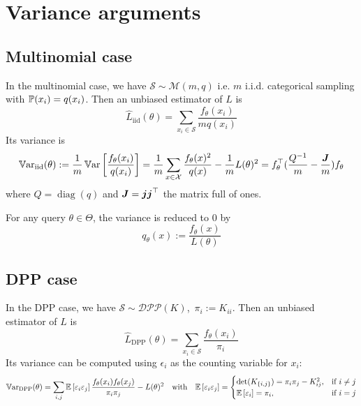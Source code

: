 \section{Variance arguments}
\subsection{Multinomial case}


In the multinomial case, we have $\mathcal S \sim \mathcal M(m, q)$ i.e. $m$ i.i.d. categorical sampling with $\mathbb{P}(x_i) = q(x_i)$.
Then an unbiased estimator of $L$ is
\begin{equation*}
	\hat L_{\textrm{iid}}(\theta) = \sum_{x_i\in \mathcal S} \frac{f_\theta(x_i)}{m q(x_i)}
\end{equation*}
Its variance is
\begin{equation}
	\operatorname{\mathbb V ar}_{\textrm{iid}}(\theta) :=\frac{1}{m} \operatorname{\mathbb V ar}\left[\frac {f_{\theta}(x_i)} {q(x_i)}\right] 
	=\frac{1}{m} \sum_{x \in \mathcal{X}} \frac{f_{\theta}(x)^{2}}{q(x)} -\frac{1}{m} L(\theta)^{2} = f_\theta^\top(\frac{Q^{-1}} m - \frac{\boldsymbol{J}} m)f_\theta
\end{equation}
where $Q = \operatorname{diag}(q)$ and $\boldsymbol{J} = \boldsymbol{j} \boldsymbol{j} ^\top$ the matrix full of ones. 

For any query $\theta \in \Theta$, the variance is reduced to 0 by
$$
q_{\theta}(x):=\frac{ f_{\theta}(x)}{L(\theta)}
$$


\subsection{DPP case}
In the DPP case, we have $ \mathcal S \sim \mathcal{DPP}(K)$, \,$\pi_i := K_{ii}$. Then an unbiased estimator of $L$ is
\begin{equation*}
	\hat L_{\textrm{DPP}}(\theta) = \sum_{x_i\in \mathcal S} \frac{f_\theta(x_i)}{\pi_i}
\end{equation*}
Its variance can be computed using $\epsilon_i$ as the counting variable for $x_i$:
$$
\operatorname{\mathbb V ar}_{\textrm{DPP}}(\theta)
=\sum_{i, j}\mathbb{E}\left[\varepsilon_{i} \varepsilon_{j}\right] \frac{f_\theta(x_{i}) f_\theta(x_{j})} {\pi_{i} \pi_{j}}  - L(\theta)^{2}
\quad \text{with} \quad
\mathbb{E}\left[\varepsilon_{i} \varepsilon_{j}\right]=
\begin{cases}
	\det(K_{\{i, j\}})=\pi_{i} \pi_{j}-K_{ij}^{2}, & \text{if } i \neq j \\
	\mathbb{E}\left[\varepsilon_{i}\right]=\pi_{i},&\text{if } i = j
\end{cases}
$$



